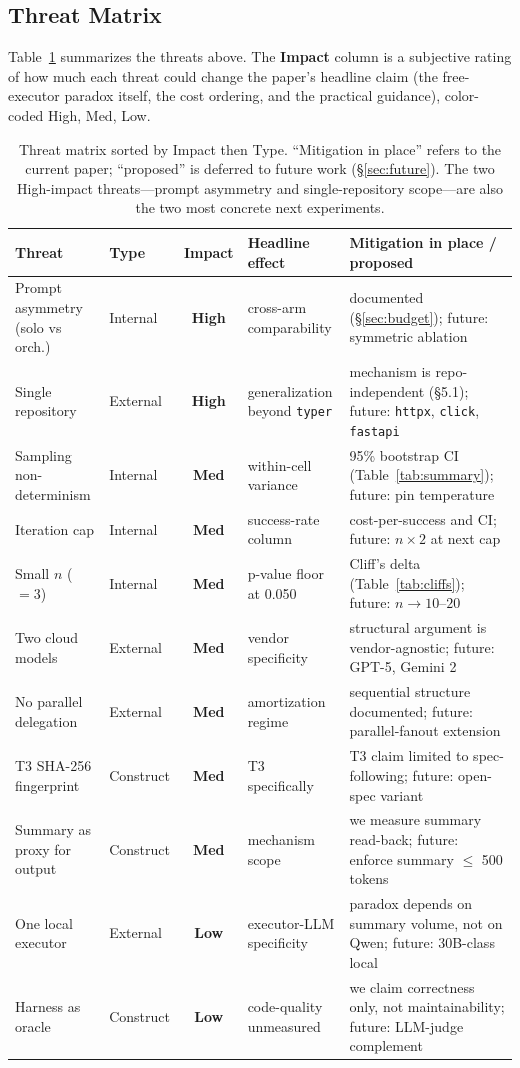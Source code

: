 \documentclass[11pt,a4paper]{article}
\newcommand{\impH}{\cellcolor{impactHigh}\textbf{High}}
\newcommand{\impM}{\cellcolor{impactMed}\textbf{Med}}
\newcommand{\impL}{\cellcolor{impactLow}\textbf{Low}}
\begin{document}
\subsection{Threat Matrix}

Table~\ref{tab:threats} summarizes the threats above. The \textbf{Impact} column is a subjective rating of how much each threat could change the paper's headline claim (the free-executor paradox itself, the cost ordering, and the practical guidance), color-coded \colorbox{impactHigh}{High}, \colorbox{impactMed}{Med}, \colorbox{impactLow}{Low}.

\begin{table}[H]
\centering
\small
\begin{tabular}{p{3.3cm} l c p{3.0cm} p{4.0cm}}
\toprule
\textbf{Threat} & \textbf{Type} & \textbf{Impact} & \textbf{Headline effect} & \textbf{Mitigation in place / proposed} \\
\midrule
Prompt asymmetry (solo vs orch.) & Internal & \impH & cross-arm comparability & documented (\S\ref{sec:budget}); future: symmetric ablation \\
Single repository & External & \impH & generalization beyond \texttt{typer} & mechanism is repo-independent (\S5.1); future: \texttt{httpx}, \texttt{click}, \texttt{fastapi} \\
Sampling non-determinism & Internal & \impM & within-cell variance & 95\% bootstrap CI (Table~\ref{tab:summary}); future: pin temperature \\
Iteration cap & Internal & \impM & success-rate column & cost-per-success and CI; future: $n \times 2$ at next cap \\
Small $n$ ($=3$) & Internal & \impM & p-value floor at 0.050 & Cliff's delta (Table~\ref{tab:cliffs}); future: $n \to 10$--$20$ \\
Two cloud models & External & \impM & vendor specificity & structural argument is vendor-agnostic; future: GPT-5, Gemini 2 \\
No parallel delegation & External & \impM & amortization regime & sequential structure documented; future: parallel-fanout extension \\
T3 SHA-256 fingerprint & Construct & \impM & T3 specifically & T3 claim limited to spec-following; future: open-spec variant \\
Summary as proxy for output & Construct & \impM & mechanism scope & we measure summary read-back; future: enforce summary $\leq$ 500 tokens \\
One local executor & External & \impL & executor-LLM specificity & paradox depends on summary volume, not on Qwen; future: 30B-class local \\
Harness as oracle & Construct & \impL & code-quality unmeasured & we claim correctness only, not maintainability; future: LLM-judge complement \\
\bottomrule
\end{tabular}
\caption{Threat matrix sorted by Impact then Type. ``Mitigation in place'' refers to the current paper; ``proposed'' is deferred to future work (\S\ref{sec:future}). The two High-impact threats---prompt asymmetry and single-repository scope---are also the two most concrete next experiments.}
\label{tab:threats}
\end{table}
\end{document}
